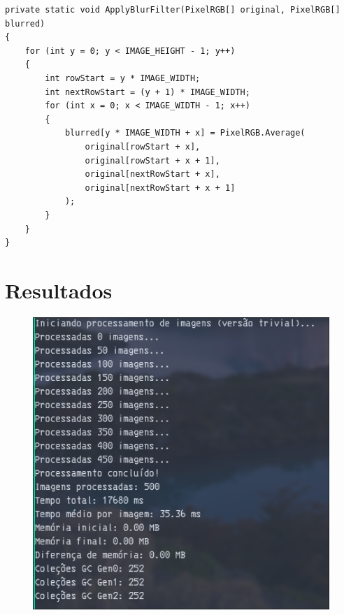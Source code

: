 \documentclass[
	12pt,				%
	oneside,			%
	a4paper,			%
	english,			%
	brazil,				%
	]{abntex2}
\begin{document}
{\begin{lstlisting}
private static void ApplyBlurFilter(PixelRGB[] original, PixelRGB[] blurred)
{
    for (int y = 0; y < IMAGE_HEIGHT - 1; y++)
    {
        int rowStart = y * IMAGE_WIDTH;
        int nextRowStart = (y + 1) * IMAGE_WIDTH;
        for (int x = 0; x < IMAGE_WIDTH - 1; x++)
        {
            blurred[y * IMAGE_WIDTH + x] = PixelRGB.Average(
                original[rowStart + x],
                original[rowStart + x + 1],
                original[nextRowStart + x],
                original[nextRowStart + x + 1]
            );
        }
    }
}
\end{lstlisting}

\section{Resultados}

\begin{figure}[H]
    \centering
    \includegraphics[width=1\textwidth]{imgs/versao-trivial.png}
    \label{Versão Não Otimizada}
\end{figure}

}
\end{document}
